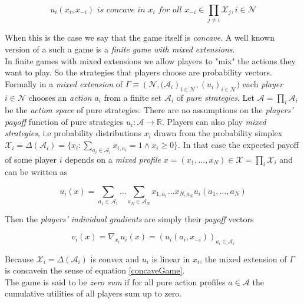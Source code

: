 \begin{equation}\label{concaveGame}
    u_i(x_i,x_{-i}) \textit{ is concave in $x_i$ for all $x_{-i} \in \prod_{j\neq i}\mathcal{X}_j,i \in \mathcal{N}$}
\end{equation}

When this is the case we say that the game itself is \textit{concave}. A well known version of a such a game is a \textit{finite game with mixed extensions}. \\

In finite games with mixed extensions we allow players to "mix" the actions they want to play. So the strategies that players choose are probability vectors. Formally in a \textit{mixed extension} of $\Gamma \equiv (\mathcal{N}, {(\mathcal{A}_i})_{i\in\mathcal{N}},{(u_i)}_{i\in\mathcal{N}})$ each \textit{player} $i \in \mathcal{N}$ chooses an \textit{action} $a_i$ from a finite set $\mathcal{A}_i$ of \textit{pure strategies}. Let $\mathcal{A} = \prod_{i}\mathcal{A}_i$ be the \textit{action space} of pure strategies. There are no assumptions on the \textit{players' payoff} function of pure strategies $u_i: \mathcal{A} \to \mathbb{R}$. Players can also play \textit{mixed strategies}, i.e probability distributions $x_i$ drawn from the probability simplex $\mathcal{X}_i = \Delta(\mathcal{A}_i)  = \{x_i: \sum_{a_i\in \mathcal{A}_i}x_{i,a_i} = 1 \land x_i \ge 0\}$. In that case the expected payoff of some player $i$ depends on a \textit{mixed profile} $x = (x_1,\dots,x_N) \in \mathcal{X} = \prod_{i}\mathcal{X}_i$ and can be written as 

\begin{equation*}
    u_i(x) = \sum_{a_1\in\mathcal{A}_1}\dots\sum_{a_N\in\mathcal{A}_N} x_{1,a_1} \dots x_{N,a_N}u_i(a_1,\dots,a_N)
\end{equation*}

Then the \textit{players' individual gradients} are simply their \textit{payoff} vectors 

\begin{equation*}
    v_i(x) = \nabla_{x_i}u_i(x) = (u_i(a_i,x_{-i}))_{a_i\in\mathcal{A}_i}
\end{equation*}

Because $\mathcal{X}_i = \Delta(\mathcal{A}_i)$ is convex and $u_i$ is linear in $x_i$, the mixed extension of $\Gamma$ is concavein the sense of equation \ref{concaveGame}. \\

The game is said to be \textit{zero sum} if for all pure action profiles $a \in \mathcal{A}$ the cumulative utilities of all players sum up to zero.  

